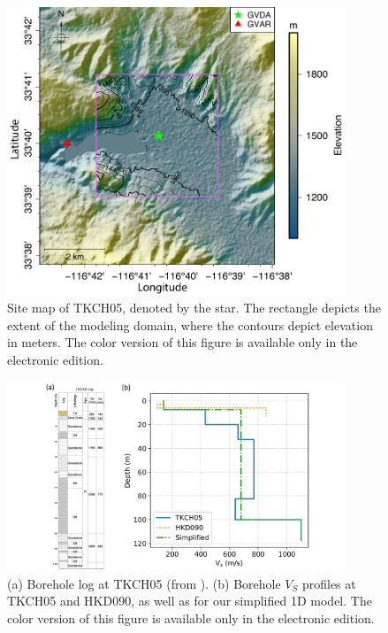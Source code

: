 {\clearpage
\begin{figure}[!ht]
  \centering
  \includegraphics[width=0.9\textwidth]{figures/figure_etf_5.pdf}
  \caption{Site map of TKCH05, denoted by the star. The rectangle depicts the extent of the modeling domain, where the contours depict elevation in meters. The color version of this figure is available only in the electronic edition.}
  \label{fig:etf-5}
\end{figure}

\clearpage
\begin{figure}[!ht]
  \centering
  \includegraphics[width=0.9\textwidth]{figures/figure_etf_6.pdf}
  \caption{(a) Borehole log at TKCH05 (from \citealt{thompsonTaxonomySiteResponse2012}). (b) Borehole $V_S$ profiles at TKCH05 and HKD090, as well as for our simplified 1D model. The color version of this figure is available only in the electronic edition.}
  \label{fig:etf-6}
\end{figure}

}

